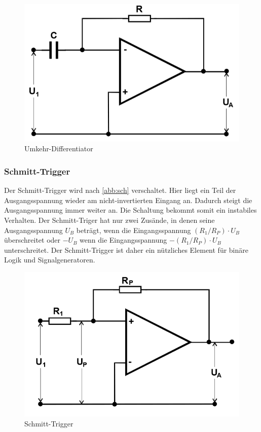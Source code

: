 \begin{figure}[h!]
 	\centering
 	\includegraphics[width=\textwidth]{img/diff.png}
 	\caption{Umkehr-Differentiator \cite{FP}}
 	\label{abb:diff}
\end{figure}


\subsubsection{Schmitt-Trigger}
Der Schmitt-Trigger wird nach \autoref{abb:sch} verschaltet. Hier liegt ein Teil der Ausgangsspannung wieder am  nicht-invertierten Eingang an. Dadurch steigt die Ausgangsspannung immer weiter an. Die Schaltung bekommt somit ein instabiles Verhalten. Der Schmitt-Triger hat nur zwei Zusände, in denen seine Ausgangsspannung $U_B$ beträgt, wenn die Eingangsspannung $(R_1 / R_P) \cdot U_B$ überschreitet oder
$-U_B$ wenn die Eingangsspannung $-(R_1 / R_P) \cdot U_B$ unterschreitet. Der Schmitt-Trigger ist daher ein nützliches Element für binäre Logik und Signalgeneratoren.

\begin{figure}[h!]
 	\centering
 	\includegraphics[width=\textwidth]{img/schmitt.png}
 	\caption{Schmitt-Trigger \cite{FP}}
 	\label{abb:sch}
\end{figure}

